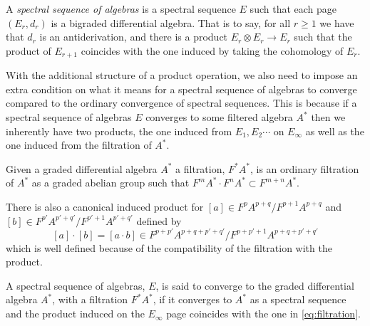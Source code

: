 \documentclass[../main.tex]{subfiles}
\begin{document}
\begin{definition}
   A \emph{spectral sequence of algebras} is a spectral sequence \( E \) 
   such that each page \( (E_r, d_r) \) is a bigraded differential algebra.
   That is to say, for all \( r\geq 1 \) we have that \( d_r \) is
   an antiderivation, and there is a product
   \( E_r \otimes E_r\rightarrow E_r \) such that the product of
   \( E_{r+1} \) coincides with the one induced by taking the
   cohomology of \( E_r \). 
\end{definition}
With the additional structure of a product operation, we also need to
impose an extra condition on what it means for a spectral sequence of
algebras to converge compared to the ordinary convergence of spectral
sequences. This is because if a spectral sequence of algebras \( E  \)
converges to some filtered algebra \( A^* \) then we inherently have
two products, the one induced from \( E_1,E_2\cdots \) on \( E_\infty \)
as well as the one induced from the filtration of \( A^* \).
\begin{definition}
    Given a graded differential algebra \( A^* \) a filtration,
    \( F^*A^* \), is an ordinary filtration of \( A^* \) as a
    graded abelian group such that \( F^{m}A^*\cdot F^{n}A^*\subset
    F^{m+n}A^*\).
\end{definition}
There is also a canonical induced product for
    \( [a]\in F^{p}A^{p+q}/F^{p+1}A^{p+q} \) and \( [b]\in F^{p'}A^{p'
    + q'}/F^{p'+1}A^{p' + q'} \) defined by
\begin{equation}
        \label{eq:filtration}
        [a]\cdot [b] = [a\cdot b] \in F^{p+p'}A^{p + q + p' + q'}/F^{p
        +p' + 1}A^{p + q + p' + q'}
\end{equation}
which is well defined because of the compatibility of the filtration
with the product.

\begin{definition}[Convergence]
    A spectral sequence of algebras, \( E \), is said to converge to
    the graded differential algebra \( A^* \), with a filtration
    \( F^*A^* \), if it converges to \( A^* \) as a spectral sequence
    and the product induced on the \( E_\infty \) page coincides with
    the one in \cref{eq:filtration}.
\end{definition}
\end{document}
